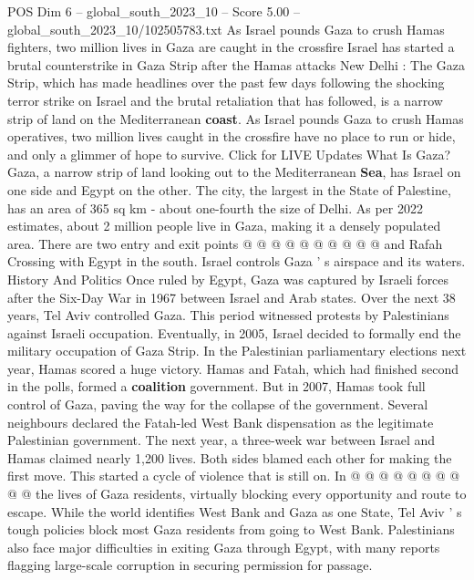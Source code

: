 \begin{textsample}{POS Dim 6 – global\_south\_2023\_10 – Score 5.00 – global\_south\_2023\_10/102505783.txt}  \label{ex:f6_pos_243}
As Israel pounds Gaza to crush Hamas fighters, two million lives in Gaza are caught in the crossfire Israel has started a brutal counterstrike in Gaza Strip after the Hamas attacks New Delhi : The Gaza Strip, which has made headlines over the past few days following the shocking terror strike on Israel and the brutal retaliation that has followed, is a narrow strip of land on the Mediterranean \textbf{coast}.
As Israel pounds Gaza to crush Hamas operatives, two million lives caught in the crossfire have no place to run or hide, and only a glimmer of hope to survive.
Click for LIVE Updates What Is Gaza?
Gaza, a narrow strip of land looking out to the Mediterranean \textbf{Sea}, has Israel on one side and Egypt on the other.
The city, the largest in the State of Palestine, has an area of 365 sq km - about one-fourth the size of Delhi.
As per 2022 estimates, about 2 million people live in Gaza, making it a densely populated area.
There are two entry and exit points @ @ @ @ @ @ @ @ @ @ and Rafah Crossing with Egypt in the south.
Israel controls Gaza ' s airspace and its waters.
History And Politics Once ruled by Egypt, Gaza was captured by Israeli forces after the Six-Day War in 1967 between Israel and Arab states.
Over the next 38 years, Tel Aviv controlled Gaza.
This period witnessed protests by Palestinians against Israeli occupation.
Eventually, in 2005, Israel decided to formally end the military occupation of Gaza Strip.
In the Palestinian parliamentary elections next year, Hamas scored a huge victory.
Hamas and Fatah, which had finished second in the polls, formed a \textbf{coalition} government.
But in 2007, Hamas took full control of Gaza, paving the way for the collapse of the government.
Several neighbours declared the Fatah-led West Bank dispensation as the legitimate Palestinian government.
The next year, a three-week war between Israel and Hamas claimed nearly 1,200 lives.
Both sides blamed each other for making the first move.
This started a cycle of violence that is still on.
In @ @ @ @ @ @ @ @ @ @ the lives of Gaza residents, virtually blocking every opportunity and route to escape.
While the world identifies West Bank and Gaza as one State, Tel Aviv ' s tough policies block most Gaza residents from going to West Bank.
Palestinians also face major difficulties in exiting Gaza through Egypt, with many reports flagging large-scale corruption in securing permission for passage.

\end{textsample}
